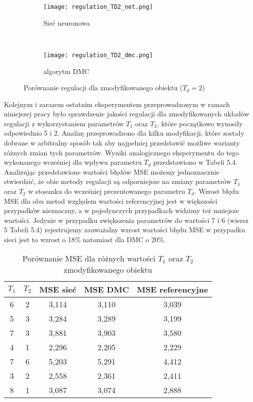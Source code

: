 \begin{figure}[!htb]
    \centering
    \begin{subfigure}[t]{0.5\textwidth}
        \centering
        \texttt{[image: regulation\_TD2\_net.png]}
        \caption{Sieć neuronowa}
    \end{subfigure}%
    ~ 
    \begin{subfigure}[t]{0.5\textwidth}
        \centering
        \texttt{[image: regulation\_TD2\_dmc.png]}
        \caption{algorytm DMC}
    \end{subfigure}
    \caption{Porównanie regulacji dla zmodyfikowanego obiektu (\(T_d=2\))}
\end{figure}

\par Kolejnym i zarazem ostatnim eksperymentem przeprowadzonym w ramach niniejszej pracy było sprawdzenie jakości regulacji dla zmodyfikowanych układów regulacji z wykorzystaniem parametrów \(T_1\) oraz \(T_2\), które początkowo wynosiły odpowiednio 5 i 2. Analizę przeprowadzono dla kilku modyfikacji, które zostały dobrane w arbitralny sposób tak aby najpełniej przedstawić możliwe warianty różnych zmian tych parametrów. Wyniki analogicznego eksperymentu do tego wykonanego wcześniej dla wpływu parametru \(T_d\) przedstawiono w Tabeli 5.4. Analizując przedstawione wartości błędów MSE możemy jednoznacznie stwierdzić, że obie metody regulacji są odporniejsze na zmiany parametrów \(T_1\) oraz \(T_2\) w stosunku do wcześniej prezentowanego parametru \(T_d\). Wzrost błędu MSE dla obu metod względem wartości referencyjnej jest w większości przypadków nieznaczny, a w pojedynczych przypadkach widzimy też mniejsze wartości. Jedynie w przypadku zwiększenia parametrów do wartości 7 i 6 (wiersz 5 Tabeli 5.4) rejestrujemy zauważalny wzrost wartości błędu MSE w przypadku sieci jest to wzrost o 18\% natomiast dla DMC o 20\%.     

\begin{table}[!htb] \label{tab:tabela4} \centering
\caption{Porównanie MSE dla różnych wartości \(T_1\) oraz \(T_2\) zmodyfikowanego obiektu}
\begin{tabular} {| c | c | c | c | c |} \hline
    \(T_1\) & \(T_2\) & MSE sieć & MSE DMC & MSE referencyjne  \\ \hline\hline
    6 & 2 & 3,114 & 3,110 & 3,039 \\ \hline
    5 & 3 & 3,284 & 3,289 & 3,199 \\ \hline
    7 & 3 & 3,881 & 3,903 & 3,580 \\ \hline
    4 & 1 & 2,296 & 2,205 & 2,229 \\ \hline
    7 & 6 & 5,203 & 5,291 & 4,412 \\ \hline
    3 & 2 & 2,558 & 2,361 & 2,411 \\ \hline
    8 & 1 & 3,087 & 3,074 & 2,888 \\ \hline
\end{tabular}
\end{table}

